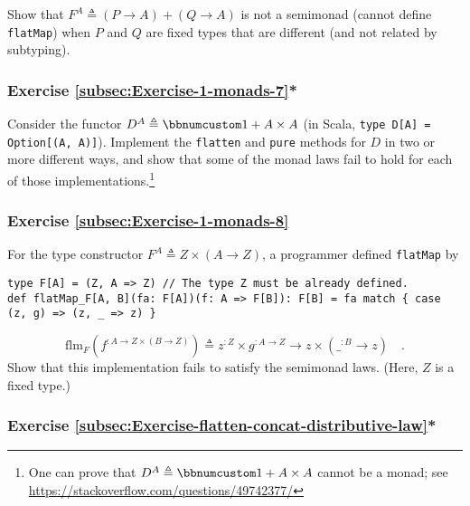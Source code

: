 Show that $F^{A}\triangleq\left(P\rightarrow A\right)+\left(Q\rightarrow A\right)$
is not a semimonad (cannot define \lstinline!flatMap!) when $P$
and $Q$ are fixed types that are different (and not related by subtyping).

\subsubsection{Exercise \label{subsec:Exercise-1-monads-7}\ref{subsec:Exercise-1-monads-7}{*}}

Consider the functor $D^{A}\triangleq\bbnum 1+A\times A$ (in Scala,
\lstinline!type D[A] = Option[(A, A)]!). Implement the \lstinline!flatten!
and \lstinline!pure! methods for $D$ in two or more different ways,
and show that some of the monad laws fail to hold for each of those
implementations.\footnote{One can prove that $D^{A}\triangleq\bbnum 1+A\times A$ cannot be
a monad; see \href{https://stackoverflow.com/questions/49742377/}{https://stackoverflow.com/questions/49742377/}}

\subsubsection{Exercise \label{subsec:Exercise-1-monads-8}\ref{subsec:Exercise-1-monads-8}}

For the type constructor $F^{A}\triangleq Z\times\left(A\rightarrow Z\right)$,
a programmer defined \lstinline!flatMap! by
\begin{lstlisting}
type F[A] = (Z, A => Z) // The type Z must be already defined.
def flatMap_F[A, B](fa: F[A])(f: A => F[B]): F[B] = fa match { case (z, g) => (z, _ => z) }
\end{lstlisting}
\[
\text{flm}_{F}(f^{:A\rightarrow Z\times\left(B\rightarrow Z\right)})\triangleq z^{:Z}\times g^{:A\rightarrow Z}\rightarrow z\times(\_^{:B}\rightarrow z)\quad.
\]
Show that this implementation fails to satisfy the semimonad laws.
(Here, $Z$ is a fixed type.)

\subsubsection{Exercise \label{subsec:Exercise-flatten-concat-distributive-law}\ref{subsec:Exercise-flatten-concat-distributive-law}{*}}

